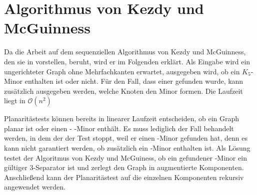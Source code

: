 \chapter{Algorithmus von Kezdy und McGuinness}
\label{cha:algorithmuskezdymcguinness}

Da die Arbeit auf dem sequenziellen Algorithmus von Kezdy und McGuinness, den sie in \cite{Kez92} vorstellen, beruht, wird er im Folgenden erklärt.
Als Eingabe wird ein ungerichteter Graph ohne Mehrfachkanten erwartet, ausgegeben wird, ob ein $K_5$-Minor enthalten ist oder nicht.
Für den Fall, dass einer gefunden wurde, kann zusätzlich ausgegeben werden, welche Knoten den Minor formen.
Die Laufzeit liegt in $\mathcal{O}(n^2)$

Planaritästests können bereits in linearer Laufzeit entscheiden, ob ein Graph planar ist oder einen \kf- \bzw \kdd-Minor enthält.
Es muss lediglich der Fall behandelt werden, in dem der der Test stoppt, weil er einen \kdd-Minor gefunden hat, denn es kann nicht garantiert werden, ob zusätzlich ein \kf-Minor enthalten ist.
Als Lösung testet der Algoritmus von Kezdy und McGuiness, ob ein gefundener \kdd-Minor ein gültiger $3$-Separator ist und zerlegt \ggf den Graph in augmentierte Komponenten.
Anschließend kann der Planaritästest auf die einzelnen Komponenten rekursiv angewendet werden.

